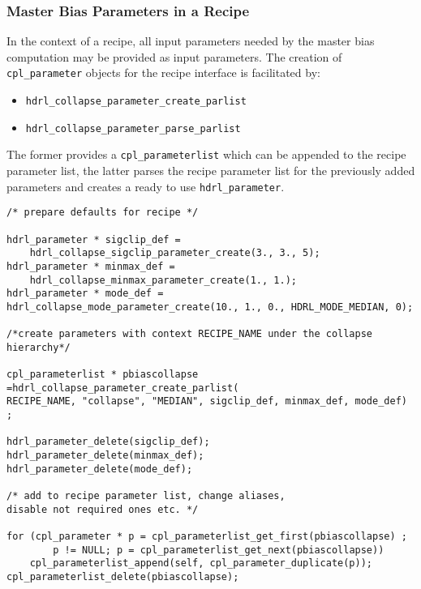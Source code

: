 \subsubsection{Master Bias Parameters in a Recipe}
\label{sec:algorithms:bias:parameters}

In the context of a recipe, all input parameters needed by the master bias
computation may be provided as input parameters.
The creation of \verb+cpl_parameter+ objects for the recipe interface is
facilitated by:
\begin{itemize}
\item \verb+hdrl_collapse_parameter_create_parlist+
\item \verb+hdrl_collapse_parameter_parse_parlist+
\end{itemize}
The former provides a \verb+cpl_parameterlist+ which can be appended to the
recipe parameter list, the latter parses the recipe parameter list for the
previously added parameters and creates a ready to use \verb+hdrl_parameter+.

\begin{lstlisting}
/* prepare defaults for recipe */

hdrl_parameter * sigclip_def = 
    hdrl_collapse_sigclip_parameter_create(3., 3., 5);
hdrl_parameter * minmax_def =
    hdrl_collapse_minmax_parameter_create(1., 1.);
hdrl_parameter * mode_def =
hdrl_collapse_mode_parameter_create(10., 1., 0., HDRL_MODE_MEDIAN, 0);
    
/*create parameters with context RECIPE_NAME under the collapse hierarchy*/

cpl_parameterlist * pbiascollapse =hdrl_collapse_parameter_create_parlist(
RECIPE_NAME, "collapse", "MEDIAN", sigclip_def, minmax_def, mode_def) ;

hdrl_parameter_delete(sigclip_def); 
hdrl_parameter_delete(minmax_def);
hdrl_parameter_delete(mode_def);

/* add to recipe parameter list, change aliases,
disable not required ones etc. */

for (cpl_parameter * p = cpl_parameterlist_get_first(pbiascollapse) ;
        p != NULL; p = cpl_parameterlist_get_next(pbiascollapse))
    cpl_parameterlist_append(self, cpl_parameter_duplicate(p));
cpl_parameterlist_delete(pbiascollapse);

\end{lstlisting}

